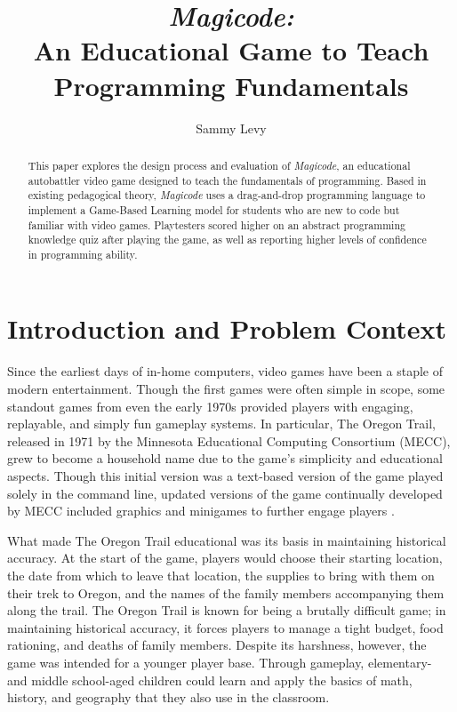 \documentclass[10pt,twocolumn]{article}
\title{\textit{Magicode:} \\ An Educational Game to Teach Programming Fundamentals}
\author{Sammy Levy}
\affiliation{Occidental College}
\begin{document}
\maketitle

\begin{abstract}
    This paper explores the design process and evaluation of \textit{Magicode}, an educational autobattler video game designed to teach the fundamentals of programming. Based in existing pedagogical theory, \textit{Magicode} uses a drag-and-drop programming language to implement a Game-Based Learning model for students who are new to code but familiar with video games. Playtesters scored higher on an abstract programming knowledge quiz after playing the game, as well as reporting higher levels of confidence in programming ability.
\end{abstract}

\section{Introduction and Problem Context}
Since the earliest days of in-home computers, video games have been a staple of modern entertainment. Though the first games were often simple in scope, some standout games from even the early 1970s provided players with engaging, replayable, and simply fun gameplay systems. In particular, The Oregon Trail, released in 1971 by the Minnesota Educational Computing Consortium (MECC), \cite{oregon-trail-video} grew to become a household name due to the game’s simplicity and educational aspects. Though this initial version was a text-based version of the game played solely in the command line, updated versions of the game continually developed by MECC included graphics and minigames to further engage players \cite{oregon-trail-archived}.

What made The Oregon Trail educational was its basis in maintaining historical accuracy. At the start of the game, players would choose their starting location, the date from which to leave that location, the supplies to bring with them on their trek to Oregon, and the names of the family members accompanying them along the trail. The Oregon Trail is known for being a brutally difficult game; in maintaining historical accuracy, it forces players to manage a tight budget, food rationing, and deaths of family members. Despite its harshness, however, the game was intended for a younger player base. Through gameplay, elementary- and middle school-aged children could learn and apply the basics of math, history, and geography that they also use in the classroom.
\end{document}
